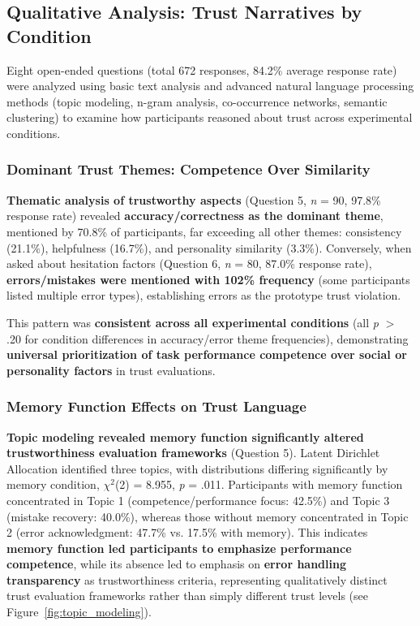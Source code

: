 \documentclass[12pt]{article}
\begin{document}
\subsection{Qualitative Analysis: Trust Narratives by Condition}

Eight open-ended questions (total 672 responses, 84.2\% average response rate) were analyzed using basic text analysis and advanced natural language processing methods (topic modeling, n-gram analysis, co-occurrence networks, semantic clustering) to examine how participants reasoned about trust across experimental conditions.

\subsubsection{Dominant Trust Themes: Competence Over Similarity}

\textbf{Thematic analysis of trustworthy aspects} (Question 5, \textit{n} = 90, 97.8\% response rate) revealed \textbf{accuracy/correctness as the dominant theme}, mentioned by 70.8\% of participants, far exceeding all other themes: consistency (21.1\%), helpfulness (16.7\%), and personality similarity (3.3\%). Conversely, when asked about hesitation factors (Question 6, \textit{n} = 80, 87.0\% response rate), \textbf{errors/mistakes were mentioned with 102\% frequency} (some participants listed multiple error types), establishing errors as the prototype trust violation.

This pattern was \textbf{consistent across all experimental conditions} (all \textit{p} $>$ .20 for condition differences in accuracy/error theme frequencies), demonstrating \textbf{universal prioritization of task performance competence over social or personality factors} in trust evaluations.

\subsubsection{Memory Function Effects on Trust Language}

\textbf{Topic modeling revealed memory function significantly altered trustworthiness evaluation frameworks} (Question 5). Latent Dirichlet Allocation identified three topics, with distributions differing significantly by memory condition, $\chi^2$(2) = 8.955, \textit{p} = .011. Participants with memory function concentrated in Topic 1 (competence/performance focus: 42.5\%) and Topic 3 (mistake recovery: 40.0\%), whereas those without memory concentrated in Topic 2 (error acknowledgment: 47.7\% vs. 17.5\% with memory). This indicates \textbf{memory function led participants to emphasize performance competence}, while its absence led to emphasis on \textbf{error handling transparency} as trustworthiness criteria, representing qualitatively distinct trust evaluation frameworks rather than simply different trust levels (see Figure~\ref{fig:topic_modeling}).
\end{document}
